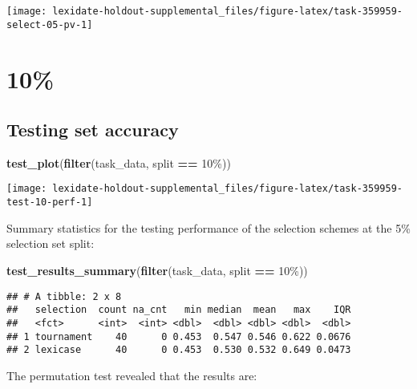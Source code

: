 \documentclass[
]{book}
\newenvironment{Shaded}{\begin{snugshade}}{\end{snugshade}}
\newcommand{\FunctionTok}[1]{\textcolor[rgb]{0.13,0.29,0.53}{\textbf{#1}}}
\newcommand{\NormalTok}[1]{#1}
\newcommand{\SpecialCharTok}[1]{\textcolor[rgb]{0.81,0.36,0.00}{\textbf{#1}}}
\newcommand{\StringTok}[1]{\textcolor[rgb]{0.31,0.60,0.02}{#1}}
\begin{document}
\texttt{[image: lexidate-holdout-supplemental\_files/figure-latex/task-359959-select-05-pv-1]}

\hypertarget{section-36}{%
\section{10\%}\label{section-36}}

\hypertarget{testing-set-accuracy-36}{%
\subsection{Testing set accuracy}\label{testing-set-accuracy-36}}

\begin{Shaded}
\begin{Highlighting}[]
\FunctionTok{test\_plot}\NormalTok{(}\FunctionTok{filter}\NormalTok{(task\_data, split }\SpecialCharTok{==} \StringTok{\textquotesingle{}10\%\textquotesingle{}}\NormalTok{))}
\end{Highlighting}
\end{Shaded}

\texttt{[image: lexidate-holdout-supplemental\_files/figure-latex/task-359959-test-10-perf-1]}

Summary statistics for the testing performance of the selection schemes at the 5\% selection set split:

\begin{Shaded}
\begin{Highlighting}[]
\FunctionTok{test\_results\_summary}\NormalTok{(}\FunctionTok{filter}\NormalTok{(task\_data, split }\SpecialCharTok{==} \StringTok{\textquotesingle{}10\%\textquotesingle{}}\NormalTok{))}
\end{Highlighting}
\end{Shaded}

\begin{verbatim}
## # A tibble: 2 x 8
##   selection  count na_cnt   min median  mean   max    IQR
##   <fct>      <int>  <int> <dbl>  <dbl> <dbl> <dbl>  <dbl>
## 1 tournament    40      0 0.453  0.547 0.546 0.622 0.0676
## 2 lexicase      40      0 0.453  0.530 0.532 0.649 0.0473
\end{verbatim}

The permutation test revealed that the results are:
\end{document}
